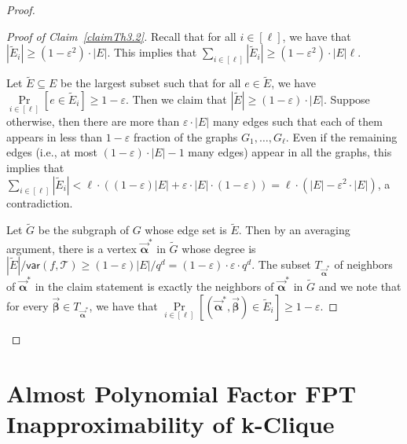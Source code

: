 \documentclass[10pt,a4paper]{article}
\renewcommand{\ge}{ \geqslant}
\newcommand{\alphab}{\vec{\bm{\alpha}}}
\newcommand{\betab}{\vec{\bm{\beta}}}
\newcommand{\var}{\mathsf{var}}
\renewcommand{\tilde}{\widetilde}
\begin{document}
\begin{proof}
	 \begin{proof}[Proof of Claim~\ref{claimTh3.2}] Recall that for all $i\in [\ell]$, we have that 
		$|\tilde E_i|\ge (1-\varepsilon^2)\cdot |E|$. This implies that $\sum_{i\in [\ell]}|\tilde E_i|\ge (1-\varepsilon^2)\cdot |E|\ell$.
		
		Let $\tilde E\subseteq E$ be the largest subset such that for all $e\in \tilde E$, we have $\underset{i\in [\ell]}{\Pr}[e\in \tilde E_i]\ge 1-\varepsilon$.  Then we claim that $|\tilde E|\ge (1-\varepsilon)\cdot |E|$. Suppose otherwise, then there are more than $\varepsilon\cdot |E|$ many edges  such that each of them appears in less than $1-\varepsilon$ fraction of the graphs $G_1,\ldots ,G_{\ell}$. Even if the remaining edges (i.e., at most $(1-\varepsilon)\cdot |E|-1$ many edges) appear in all the graphs, this implies that $\sum_{i\in [\ell]}|\tilde E_i|< \ell\cdot( (1-\varepsilon)|E| + \varepsilon\cdot |E|\cdot (1-\varepsilon)) = \ell\cdot \left(|E| -\varepsilon^{2}\cdot |E|\right)$, a contradiction. 
		
		Let $\tilde G$ be the subgraph of $G$ whose edge set is $\tilde E$. Then by an averaging argument, there is a vertex $\alphab^*$ in $\tilde G$ whose  degree is $|\tilde E|/\var(f,\mathcal{T})\ge (1-\varepsilon)|E|/q^d= (1-\varepsilon)\cdot \varepsilon\cdot q^d$. The subset $T_{\alphab^*}$ of neighbors of $\alphab^*$ in the claim statement is exactly the neighbors of $\alphab^*$ in $\tilde{G}$ and we note that for every $\betab\in T_{\alphab^*}$, we have that  $\underset{i\in [\ell]}{\Pr}[(\alphab^*,\betab)\in \tilde E_i]\ge 1-\varepsilon$. 
	\end{proof}
	
\end{proof}




\section{Almost Polynomial Factor FPT Inapproximability of k-Clique}\label{sec:main}
\end{document}
